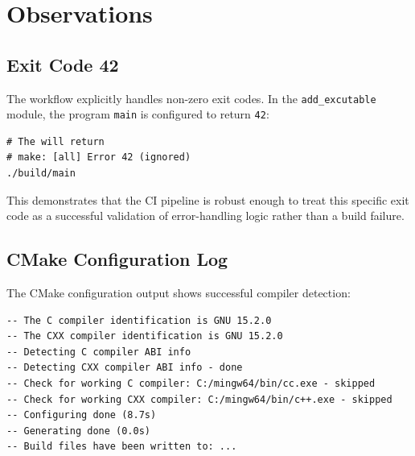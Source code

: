 \section{Observations}

\subsection{Exit Code 42}
The workflow explicitly handles non-zero exit codes. In the \texttt{add\_excutable} module, the program \texttt{main} is configured to return \texttt{42}:

\begin{verbatim}
# The will return
# make: [all] Error 42 (ignored)
./build/main
\end{verbatim}

This demonstrates that the CI pipeline is robust enough to treat this specific exit code as a successful validation of error-handling logic rather than a build failure.

\subsection{CMake Configuration Log}
The CMake configuration output shows successful compiler detection:

\begin{verbatim}
-- The C compiler identification is GNU 15.2.0
-- The CXX compiler identification is GNU 15.2.0
-- Detecting C compiler ABI info
-- Detecting CXX compiler ABI info - done
-- Check for working C compiler: C:/mingw64/bin/cc.exe - skipped
-- Check for working CXX compiler: C:/mingw64/bin/c++.exe - skipped
-- Configuring done (8.7s)
-- Generating done (0.0s)
-- Build files have been written to: ...
\end{verbatim}

